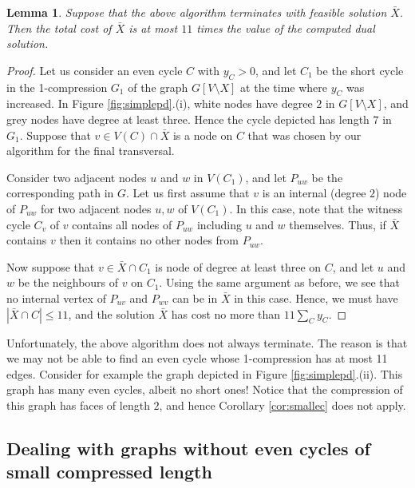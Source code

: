 \documentclass{article}
\newcommand{\0}{\mathbb{0}}
\newcommand{\1}{\mathbb{1}}
\newtheorem{lemma}[theorem]{Lemma}
\begin{document}
\begin{lemma} \label{lem:simplealg}
  Suppose that the above algorithm terminates with
  feasible solution $\bar{X}$. Then the total cost of $\bar{X}$ is at
  most $11$ times the value of the computed dual solution.
\end{lemma}
\begin{proof}
  Let us consider an even cycle $C$ with $y_C>0$, and let $C_1$ be the
  short cycle in the 1-compression $G_1$ of the graph $G[V\setminus
  X]$ at the time where $y_C$ was increased. 
  In Figure
  \ref{fig:simplepd}.(i), white nodes have degree $2$ in $G[V\setminus
  X]$, and grey nodes have degree at least three. Hence the cycle
  depicted has length $7$ in $G_1$. Suppose that $v \in V(C) \cap
  \bar{X}$ is a node on $C$ that was chosen by our algorithm for the
  final transversal.

  Consider two adjacent nodes $u$ and $w$ in $V(C_1)$, and let
  $P_{uw}$ be the corresponding path in $G$. 
  Let us first assume that $v$ is an internal (degree $2$) node of
  $P_{uw}$ for two adjacent nodes $u,w$ of $V(C_1)$. In this case,
  note that the witness cycle $C_v$ of $v$ contains all nodes of
  $P_{uw}$ including $u$ and $w$ themselves. Thus, if $\bar{X}$
  contains $v$ then it contains no other nodes from $P_{uw}$.

  Now suppose that $v \in \bar{X} \cap C_1$ is node of
  degree at least three on $C$, and let $u$ and $w$ be the neighbours
  of $v$ on $C_1$. Using the same argument as before, we see that
  no internal vertex of $P_{uv}$ and $P_{wv}$ can be in $\bar{X}$ in
  this case. Hence, we must have
  $|\bar{X} \cap C| \leq 11$, and the solution
  $\bar{X}$ has cost no more than $11\sum_Cy_C$. 
\end{proof}

Unfortunately, the above algorithm does not always terminate. The
reason is that we may not be able to find an even cycle whose
1-compression has at most 11 edges. Consider for example the 
graph depicted in Figure \ref{fig:simplepd}.(ii). This graph has many even
cycles, albeit no short ones! Notice that the compression of this
graph has faces of length $2$, and hence Corollary \ref{cor:smallec}
does not apply. 

\subsection{Dealing with graphs without even cycles of small
  compressed length}
\end{document}
